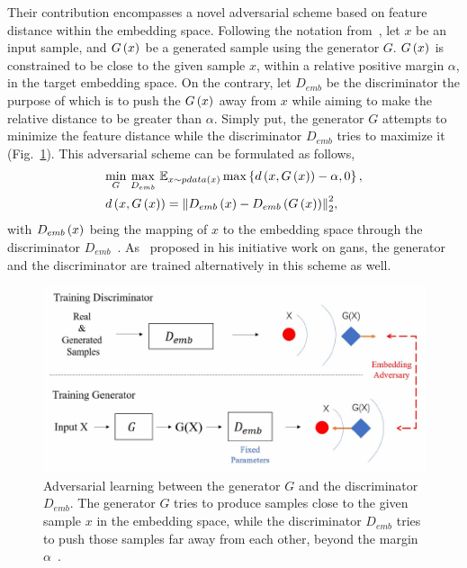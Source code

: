 Their contribution encompasses a novel adversarial scheme based on feature distance within the embedding space. Following the notation from~\cite{lou2019embreid}, let $x$ be an input sample, and ${G} \left( x \right)$ be a generated sample using the generator $G$. ${G} \left( x \right)$ is constrained to be close to the given sample $x$, within a relative positive margin $\alpha$, in the target embedding space. On the contrary, let $D_{emb}$ be the discriminator the purpose of which is to push the ${G} \left( x \right)$ away from $x$ while aiming to make the relative distance to be greater than $\alpha$. Simply put, the generator $G$ attempts to minimize the feature distance while the discriminator $D_{emb}$ tries to maximize it (Fig.~\ref{fig:EALNDiscriminatorGeneratorScheme}). This adversarial scheme can be formulated as follows,
\begin{equation}
    \begin{aligned}
        &\underset{G}{\min} \ \underset{D_{emb}}{\max} \ \mathbb{E}_{x \sim \func{pdata}{x}} \max \cbrackets{\func{d}{x, \func{G}{x}} - \alpha, 0},\\
        &\func{d}{x, \func{G}{x}} = \euclnorm{\func{D_{emb}}{x} - \func{D_{emb}}{\func{G}{x}}}^2,
    \end{aligned}
\end{equation}
with ${D_{emb}} \left( x \right)$ being the mapping of $x$ to the embedding space through the discriminator $D_{emb}$~\cite{lou2019embreid}. As~\cite{goodfellow2014gans} proposed in his initiative work on \glspl{gan}, the generator and the discriminator are trained alternatively in this scheme as well.

\begin{figure}[t]
    \centerline{\includegraphics[width=0.8\linewidth]{figures/theoretical_foundations/ealn_discriminator_generator_scheme.pdf}}
    \caption[Embedding adversarial learning architecture]{Adversarial learning between the generator $G$ and the discriminator $D_{emb}$. The generator $G$ tries to produce samples close to the given sample $x$ in the embedding space, while the discriminator $D_{emb}$ tries to push those samples far away from each other, beyond the margin $\alpha$~\cite{lou2019embreid}.}
    \label{fig:EALNDiscriminatorGeneratorScheme}
\end{figure}

